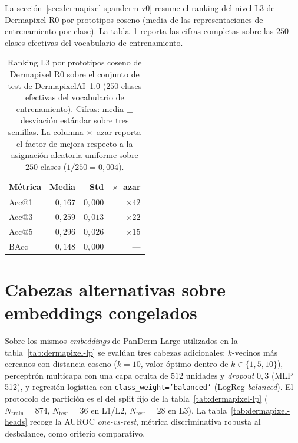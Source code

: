 La sección~\ref{sec:dermapixel-spanderm-v0} resume el ranking del
nivel L3 de Dermapixel R0 por prototipos coseno (media de las
representaciones de entrenamiento por clase). La
tabla~\ref{tab:dermapixel-spanderm-l3} reporta las cifras completas
sobre las $250$ clases efectivas del vocabulario de entrenamiento.

\begin{table}[H]
\centering
\footnotesize
\setlength{\tabcolsep}{4pt}
\renewcommand{\arraystretch}{0.95}
\caption{Ranking L3 por prototipos coseno de Dermapixel R0 sobre el
conjunto de test de DermapixelAI~1.0 ($250$ clases efectivas
del vocabulario de entrenamiento). Cifras: media $\pm$ desviación
estándar sobre tres semillas. La columna $\times$~azar reporta el
factor de mejora respecto a la asignación aleatoria uniforme
sobre $250$ clases ($1/250 = 0{,}004$).}
\label{tab:dermapixel-spanderm-l3}
\begin{tabular}{lrrr}
\hline
Métrica & Media                 & Std            & $\times$~azar \\
\hline
Acc@1   & $0{,}167$             & $0{,}000$      & $\times 42$ \\
Acc@3   & $0{,}259$             & $0{,}013$      & $\times 22$ \\
Acc@5   & $0{,}296$             & $0{,}026$      & $\times 15$ \\
BAcc    & $0{,}148$             & $0{,}000$      & --- \\
\hline
\end{tabular}
\end{table}

\section{Cabezas alternativas sobre embeddings congelados}

Sobre los mismos \emph{embeddings} de PanDerm Large utilizados en la
tabla~\ref{tab:dermapixel-lp} se evalúan tres cabezas adicionales:
$k$-vecinos más cercanos con distancia coseno ($k = 10$, valor
óptimo dentro de $k \in \{1, 5, 10\}$), perceptrón multicapa con
una capa oculta de $512$ unidades y \emph{dropout} $0{,}3$ (MLP
512), y regresión logística con \texttt{class\_weight='balanced'}
(LogReg \emph{balanced}). El protocolo de partición es el del split
fijo de la tabla~\ref{tab:dermapixel-lp}
($N_{\mathrm{train}} = 874$, $N_{\mathrm{test}} = 36$ en L1/L2,
$N_{\mathrm{test}} = 28$ en L3). La tabla~\ref{tab:dermapixel-heads}
recoge la AUROC \emph{one-vs-rest}, métrica discriminativa robusta
al desbalance, como criterio comparativo.

